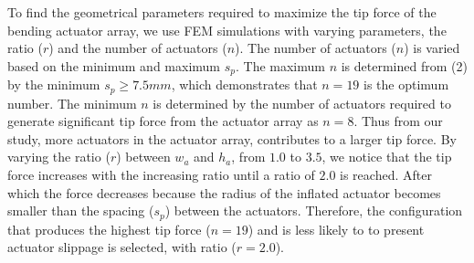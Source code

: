 \documentclass[letterpaper, 10 pt, conference]{ieeeconf}  %
\begin{document}
To find the geometrical parameters required to maximize the tip force of the bending actuator array, we use FEM simulations with varying parameters, the ratio ($r$) and the number of actuators ($n$). The number of actuators ($n$) is varied based on the minimum and maximum $s_p$. The maximum $n$ is determined from (2) by the minimum $s_p \geq 7.5mm$, which demonstrates that $n = 19$ is the optimum number.  The minimum $n$ is determined by the number of actuators required to generate significant tip force from the actuator array as $n = 8$. Thus from our study, more actuators in the actuator array, contributes to a larger tip force. By varying the ratio ($r$) between $w_a$ and $h_a$, from $1.0$ to $3.5$, we notice that the tip force increases with the increasing ratio until a ratio of $2.0$ is reached. After which the force decreases because the radius of the inflated actuator becomes smaller than the spacing ($s_p$) between the actuators. Therefore, the configuration that produces the highest tip force ($n = 19$) and is less likely to to present actuator slippage is selected, with ratio ($r =2.0$). 
% 
% 
% 
% 
% 
% 
\end{document}
